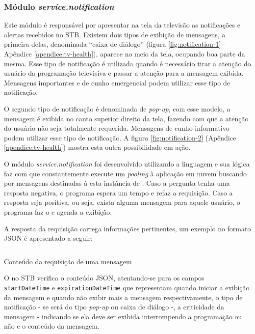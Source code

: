 
\subsubsection{Módulo \textit{service.notification}}\label{subsubsec:notification}

Este módulo é responsável por apresentar na tela da televisão as notificações e
alertas recebidos no STB. Existem dois tipos de exibição de mensagens, a
primeira delas, denominada ``caixa de diálogo'' (figura
\vref{fig:notification-1} - Apêndice \ref{apendice:tv-health}), 
aparece no meio da tela, ocupando boa parte da mesma.
Esse tipo de notificação é utilizada quando é necessário tirar a atenção do
usuário da programação televisiva e passar a atenção para a mensagem exibida.
Mensagens importantes e de cunho emergencial podem utilizar esse tipo de
notificação.   

O segundo tipo de notificação é denominada de \textit{pop-up}, com esse modelo,
a mensagem é exibida no canto superior direito da tela, fazendo com que a
atenção do usuário não seja totalmente requerida. Mensagens de cunho informativo
podem utilizar esse tipo de notificação. A figura \ref{fig:notification-2} 
(Apêndice \ref{apendice:tv-health}) mostra esta outra possibilidade em ação.

O módulo \textit{service.notification} foi desenvolvido utilizando a linguagem
\python[] e sua lógica faz com que constantemente execute um \textit{pooling} 
à aplicação em nuvem buscando por mensagens destinadas à esta instância de 
\software. Caso a pergunta tenha uma resposta negativa, o programa espera um 
tempo e refaz a requisição. Caso a resposta seja positiva, ou seja, exista 
alguma mensagem para aquele usuário, o programa faz o \download[] e agenda a
exibição. 

A resposta da requisição carrega informações pertinentes, um exemplo no formato
JSON é apresentado a seguir:

\begin{listing}[ht!]
\inputminted{json}{codigos/message.json}
\caption{Conteúdo da requisição de uma mensagem}
\label{lst:notification-json}
\end{listing}

O \software[] no STB verifica o conteúdo JSON, atentando-se para os campos 
\texttt{startDateTime} e \texttt{expirationDateTime} que representam quando 
iniciar a exibição da mensagem e quando não exibir mais a mensagem 
respectivamente, o tipo de notificação - se será do tipo \textit{pop-up} ou
caixa de diálogo -, a criticidade da mensagem - indicando se ela deve ser
exibida interrompendo a programação ou não e o conteúdo da mensagem. 

